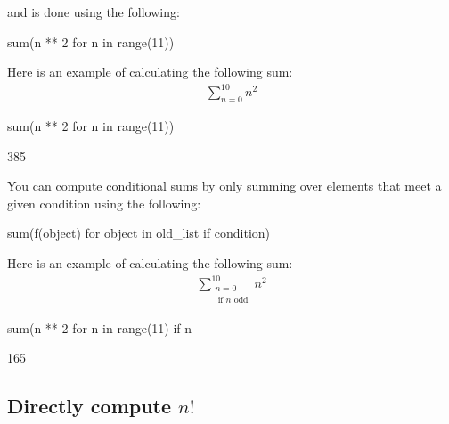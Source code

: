 and is done using the following:

\begin{pyin}
sum(n ** 2 for n in range(11))
\end{pyin}


Here is an example of calculating the following sum:
\begin{equation*}
\begin{split}
    \sum_{n=0}^{10} n ^ 2
\end{split}
\end{equation*}



\begin{pyin}
sum(n ** 2 for n in range(11))
\end{pyin}





\begin{raw}
385
\end{raw}

You can compute conditional sums by only summing over elements that
meet a given condition using the following:

\begin{api}
sum(f(object) for object in old_list if condition)
\end{api}


Here is an example of calculating the following sum:
\begin{equation*}
\begin{split}
    \sum_{\begin{array}{c}n=0\\\text{ if }n\text{ odd}\end{array}}^{10} n ^ 2
\end{split}
\end{equation*}



\begin{pyin}
sum(n ** 2 for n in range(11) if n %
\end{pyin}





\begin{raw}
165
\end{raw}





\subsection{Directly compute \(n!\)}
\label{\detokenize{tools-for-mathematics/05-combinations-permutations/how/main:directly-computing-n}}

